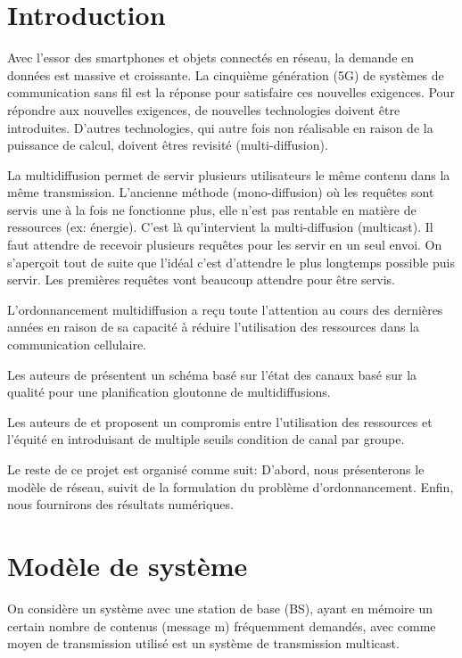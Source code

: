 \documentclass[runningheads]{llncs}
\begin{document}
\section{Introduction}
Avec l’essor des smartphones et objets connectés en réseau, la demande en données 
est massive et croissante. La cinquième génération (5G) de systèmes de 
communication sans fil est la réponse pour satisfaire ces nouvelles exigences.
Pour répondre aux nouvelles exigences, de nouvelles technologies doivent 
être introduites. D’autres technologies, qui autre fois non réalisable en 
raison de la puissance de calcul, doivent êtres revisité (multi-diffusion).

La multidiffusion permet de servir  plusieurs utilisateurs  le même contenu dans 
la même transmission. L'ancienne méthode (mono-diffusion) où les requêtes sont servis 
une à la fois ne fonctionne plus, elle n'est pas rentable en matière de 
ressources (ex: énergie). C'est là qu'intervient la multi-diffusion (multicast).
Il faut attendre de recevoir  plusieurs requêtes pour les servir en un seul
envoi. On s'aperçoit tout de suite que l'idéal c'est d'attendre le plus longtemps
possible puis servir. Les premières requêtes vont beaucoup attendre pour 
être servis.

L'ordonnancement multidiffusion a reçu toute l'attention au cours des 
dernières années en raison de sa capacité à réduire l'utilisation 
des ressources dans la communication cellulaire.

Les auteurs de \cite{inho2015} présentent un schéma bas\'e sur l'état 
des canaux basé sur la qualité pour une planification gloutonne de multidiffusions.

Les auteurs de \cite{inho2017} et \cite{hang2017} proposent un 
compromis entre l'utilisation des ressources et l'équité en introduisant 
de multiple  seuils condition de canal par groupe.


Le reste de ce projet est organis\'e comme suit: D'abord, nous 
présenterons le modèle de réseau, suivit de la formulation du 
problème d'ordonnancement. Enfin, nous fournirons des résultats 
numériques. 



\section{Modèle de système}
On considère un système avec une station de base (BS), ayant en mémoire 
un certain nombre de contenus (message m) fréquemment demandés, avec comme 
moyen de transmission utilisé est un système de transmission multicast.
\end{document}

